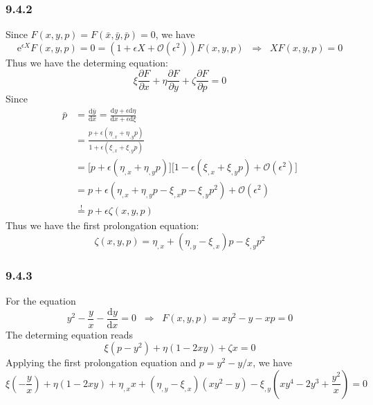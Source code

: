 \documentclass[]{ctexart}
\begin{document}
\subsubsection*{9.4.2}
Since $F(x,y,p)=F(\bar x,\bar y,\bar p)=0$, we have 
\begin{equation*}
\mathrm{e}^{\epsilon X}F(x,y,p)=0=(1+\epsilon X+\mathcal O(\epsilon^2))F(x,y,p)\;\;\Rightarrow\;\;XF(x,y,p)=0
\end{equation*}
Thus we have the determing equation: 
\begin{equation*}
\xi\frac{\partial F}{\partial x}+\eta\frac{\partial F}{\partial y}+\zeta\frac{\partial F}{\partial p}=0
\end{equation*}
Since 
\begin{align*}
\bar p&=\frac{\mathrm{d}\bar y}{\mathrm{d}\bar x}=\frac{\mathrm{d}y+\epsilon\mathrm{d}\eta}{\mathrm{d}x+\epsilon\mathrm{d}\xi}\\
&=\frac{p+\epsilon(\eta_{,x}+\eta_{,y}p)}{1+\epsilon(\xi_{,x}+\xi_{,y}p)}\\
&=\big[p+\epsilon(\eta_{,x}+\eta_{,y}p)\big]\big[1-\epsilon(\xi_{,x}+\xi_{,y}p)+\mathcal O(\epsilon^2)\big]\\
&=p+\epsilon(\eta_{,x}+\eta_{,y}p-\xi_{,x}p-\xi_{,y}p^2)+\mathcal O(\epsilon^2)\\
&\overset{!}{=}p+\epsilon\zeta(x,y,p)
\end{align*}
Thus we have the first prolongation equation: 
\begin{equation*}
\zeta(x,y,p)=\eta_{,x}+(\eta_{,y}-\xi_{,x})p-\xi_{,y}p^2
\end{equation*}
\subsubsection*{9.4.3}
For the equation 
\begin{equation*}
y^2-\frac{y}{x}-\frac{\mathrm{d}y}{\mathrm{d}x}=0\;\;\Rightarrow\;\;F(x,y,p)=xy^2-y-xp=0
\end{equation*}
The determing equation reads 
\begin{equation*}
\xi(p-y^2)+\eta(1-2xy)+\zeta x=0
\end{equation*}
Applying the first prolongation equation and $p=y^2-y/x$, we have 
\begin{equation*}
\xi\left(-\frac{y}{x}\right)+\eta(1-2xy)+\eta_{,x}x+(\eta_{,y}-\xi_{,x})(xy^2-y)-\xi_{,y}\left(xy^4-2y^3+\frac{y^2}{x}\right)=0
\end{equation*}
\end{document}
